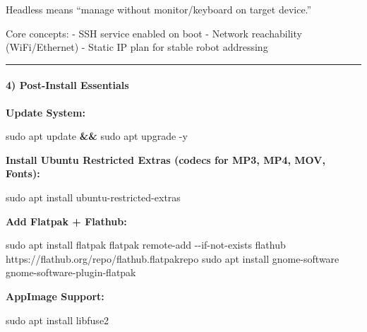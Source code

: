 \documentclass[
  english,
  paper=a4,
  oneside  ,captions=tableheading
]{scrartcl}
\newenvironment{Shaded}{}{}
\newcommand{\AttributeTok}[1]{\textcolor[rgb]{0.49,0.56,0.16}{#1}}
\newcommand{\ExtensionTok}[1]{#1}
\newcommand{\FunctionTok}[1]{\textcolor[rgb]{0.02,0.16,0.49}{#1}}
\newcommand{\KeywordTok}[1]{\textcolor[rgb]{0.00,0.44,0.13}{\textbf{#1}}}
\newcommand{\NormalTok}[1]{#1}
\begin{document}
Headless means ``manage without monitor/keyboard on target device.''

Core concepts: - SSH service enabled on boot - Network reachability
(WiFi/Ethernet) - Static IP plan for stable robot addressing

\begin{center}\rule{0.5\linewidth}{0.5pt}\end{center}

\paragraph{4) Post-Install Essentials}\label{post-install-essentials}

\textbf{Update System:}

\begin{Shaded}
\begin{Highlighting}[]
\FunctionTok{sudo}\NormalTok{ apt update }\KeywordTok{\&\&} \FunctionTok{sudo}\NormalTok{ apt upgrade }\AttributeTok{{-}y}
\end{Highlighting}
\end{Shaded}

\textbf{Install Ubuntu Restricted Extras (codecs for MP3, MP4, MOV,
Fonts):}

\begin{Shaded}
\begin{Highlighting}[]
\FunctionTok{sudo}\NormalTok{ apt install ubuntu{-}restricted{-}extras}
\end{Highlighting}
\end{Shaded}

\textbf{Add Flatpak + Flathub:}

\begin{Shaded}
\begin{Highlighting}[]
\FunctionTok{sudo}\NormalTok{ apt install flatpak}
\ExtensionTok{flatpak}\NormalTok{ remote{-}add }\AttributeTok{{-}{-}if{-}not{-}exists}\NormalTok{ flathub https://flathub.org/repo/flathub.flatpakrepo}
\FunctionTok{sudo}\NormalTok{ apt install gnome{-}software gnome{-}software{-}plugin{-}flatpak}
\end{Highlighting}
\end{Shaded}

\textbf{AppImage Support:}

\begin{Shaded}
\begin{Highlighting}[]
\FunctionTok{sudo}\NormalTok{ apt install libfuse2}
\end{Highlighting}
\end{Shaded}
\end{document}

